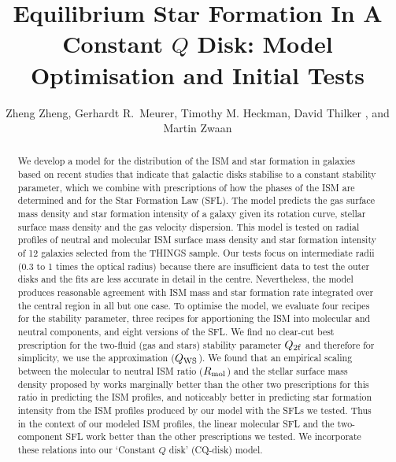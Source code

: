 \documentclass[12pt,preprint]{aastex}
\begin{document}
% 

\title{Equilibrium Star Formation In A Constant $Q$ Disk: Model Optimisation and Initial Tests}

\author{Zheng Zheng, Gerhardt R.\ Meurer, Timothy M. Heckman, David Thilker , and 
  Martin Zwaan}




\begin{abstract}
\footnotesize
We develop a  model for  the distribution of the ISM and star formation in galaxies based on recent studies that indicate that galactic disks stabilise to a constant stability parameter, which we combine with prescriptions of how the phases of the ISM are determined and for the Star Formation Law (SFL). The model predicts the gas surface mass density and star formation intensity of a galaxy given its rotation curve, stellar surface mass density and the gas velocity dispersion. This model is tested on radial profiles of neutral and molecular ISM surface mass density and star formation intensity of 12 galaxies selected from the THINGS sample.  Our tests focus on intermediate radii (0.3 to 1 times the optical radius) because there are insufficient data to test the outer disks and the fits are less accurate in detail in the centre. Nevertheless, the model produces reasonable agreement with ISM mass and star formation rate integrated over the central region in all but one case.  To  optimise the model,  we evaluate four recipes for the stability parameter, three recipes for apportioning the ISM into molecular and neutral components, and eight versions of the SFL.  We find no clear-cut best prescription for the two-fluid (gas and stars) stability parameter $Q_{\rm 2f}$ and therefore for simplicity, we use the \citet{wan94} approximation ($Q_{\rm WS}$). We found that an empirical scaling between the molecular to neutral ISM ratio ($R_{\rm mol}$) and the stellar surface mass density proposed by \citet{ler08} works marginally better than the other two prescriptions for this ratio in predicting the ISM profiles, and noticeably better in predicting star formation intensity from the ISM profiles produced by our model with the SFLs we tested. 
 Thus in the context of our modeled ISM profiles, the linear molecular SFL and the two-component SFL \citep{kru09} work better than the other prescriptions we tested. We incorporate these  relations into our `Constant $Q$ disk'  (CQ-disk) model.

\end{abstract}
\end{document}
